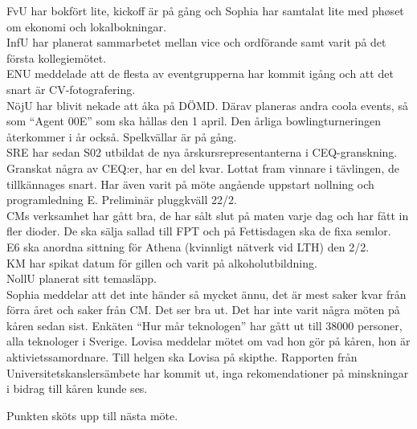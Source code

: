 \documentclass[10pt]{article}
\begin{document}
\begin{paragrafer}
\begin{paragrafer}
FvU har bokfört lite, kickoff är på gång och Sophia har samtalat lite med phøset om ekonomi och lokalbokningar.\\
InfU har planerat sammarbetet mellan vice och ordförande samt varit på det första kollegiemötet.\\
ENU meddelade att de flesta av eventgrupperna har kommit igång och att det snart är CV-fotografering.\\
NöjU har blivit nekade att åka på DÖMD. Därav planeras andra coola events, så som ``Agent 00E'' som ska hållas den 1 april. Den årliga bowlingturneringen återkommer i år också. Spelkvällar är på gång.\\
SRE har sedan S02 utbildat de nya årskursrepresentanterna i CEQ-granskning. Granskat några av CEQ:er, har en del kvar. Lottat fram vinnare i tävlingen, de tillkännages snart. Har även varit på möte angående uppstart nollning och programledning E. Preliminär pluggkväll 22/2.\\
CMs verksamhet har gått bra, de har sålt slut på maten varje dag och har fått in fler dioder. De ska sälja sallad till FPT och på Fettisdagen ska de fixa semlor.\\
E6 ska anordna sittning för Athena (kvinnligt nätverk vid LTH) den 2/2.\\
KM har spikat datum för gillen och varit på alkoholutbildning.\\
NollU planerat sitt temasläpp.\\
Sophia meddelar att det inte händer så mycket ännu, det är mest saker kvar från förra året och saker från CM. Det ser bra ut.
Det har inte varit några möten på kåren sedan sist. Enkäten ``Hur mår teknologen'' har gått ut till 38000 personer, alla teknologer i Sverige. Lovisa meddelar mötet om vad hon gör på kåren, hon är aktivietssamordnare. Till helgen ska Lovisa på skipthe.
Rapporten från Universitetskanslersämbete har kommit ut, inga rekomendationer på minskningar i bidrag till kåren kunde ses.
\end{paragrafer}

Punkten sköts upp till nästa möte.


\end{paragrafer}
\end{document}
